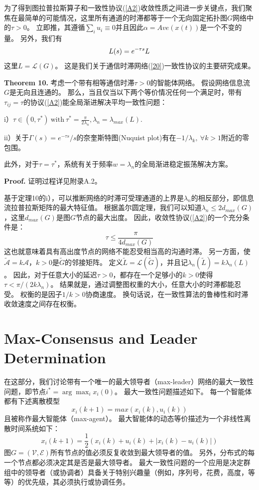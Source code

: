 \documentclass{article}
\begin{document}
为了得到图拉普拉斯算子和一致性协议(\ref{A2})收敛性质之间进一步关键点，我们聚焦在最简单的可能情况，这里所有通道的时滞都等于一个无向固定拓扑图$G$网络中的$\tau > 0$。
立即推，其遵循$\sum_i u_i \equiv 0$并且因此$\alpha = Ave(x(t))$是一个不变的量。
另外，我们有
\begin{equation}
    L(s) = e^{-\tau s}L
    \notag
\end{equation}
这里$L=\mathcal{L}(G)$。
这是我们关于通信时滞网络(\ref{20})一致性协议的主要研究成果。

\noindent \textbf{Theorem 10.} 考虑一个带有相等通信时滞$\tau > 0$的智能体网络。
假设网络信息流$G$是无向且连通的。
那么，当且仅当以下两个等价情况任何一个满足时，带有$\tau_{ij} = \tau$的协议(\ref{A2})能全局渐进解决平均一致性问题：

i）$\tau \in (0, \tau^*)\ \text{with}\ \tau^*=\frac{\pi}{2\lambda_n}, \lambda_n=\lambda_{max}(L)$.

ii）关于$\Gamma(s) = e^{-\tau s}/s$的奈奎斯特图(Nuquist plot)有在$-1/\lambda_k,\ \forall k > 1$附近的零包围。

此外，对于$\tau=\tau^*$，系统有关于频率$w=\lambda_n$的全局渐进稳定振荡解决方案。

\noindent \textbf{Proof.} 证明过程详见附录A.2。

基于定理10的i），可以推断网络的时滞可受理通道的上界是$\lambda_n$的相反部分，即信息流拉普拉斯矩阵的最大特征值。
根据盖尔圆定理，我们可以知道$\lambda_n\le 2d_{max}(G)$，这里$d_{max}(G)$是图$G$节点的最大出度。
因此，收敛性协议(\ref{A2})的一个充分条件是：
\begin{equation}
    \tau \le \frac{\pi}{4d_{max}(G)}
    \tag{40}
    \label{40}
\end{equation}
这也就意味着具有高出度节点的网络不能忍受相当高的沟通时滞。
另一方面，使$\tilde{\mathcal{A}}=k\mathcal{A}$，$k>0$是$\tilde{G}$的邻接矩阵。
定义$\tilde{L}=\mathcal{L}(\tilde{G})$，并且记$\lambda_n(\tilde{L}) = k\lambda_n(L)$。
因此，对于任意大小的延迟$\tau>0$，都存在一个足够小的$k>0$使得$\tau < \pi/(2k\lambda_n)$。
结果就是，通过调整图权重的大小，任意大小的时滞都能忍受。
权衡的是因子$1/k>0$协商速度。
换句话说，在一致性算法的鲁棒性和时滞收敛速度之间存在权衡。


\section{Max-Consensus and Leader Determination}
在这部分，我们讨论带有一个唯一的最大领导者（max-leader）网络的最大一致性问题，即节点$i^*=\arg\max_ix_i(0)$。
最大一致性问题描述如下。
每一个智能体都有下述离散模型
\begin{equation}
    \tag{41}
    \label{41}
    x_i(k+1)=max(x_i(k),u_i(k))
\end{equation}
且被称作最大智能体（max-agent）。
最大智能体的动态等价描述为一个非线性离散时间系统如下：
\begin{equation}
    \tag{42}
    \label{42}
    x_i(k+1) = \frac{1}{2}(x_i(k)+u_i(k)+|x_i(k)-u_i(k)|)
\end{equation}
图$G=(\mathcal{V},\mathcal{E})$所有节点的值必须反复收敛到最大领导者的值。
另外，分布式的每一个节点都必须决定其是否是最大领导者。
最大一致性问题的一个应用是决定群组中的领导者（或协调者）具备关于特别兴趣量（例如，序列号，花费，高度，等等）的优先级，其必须执行或协调任务。
\end{document}
